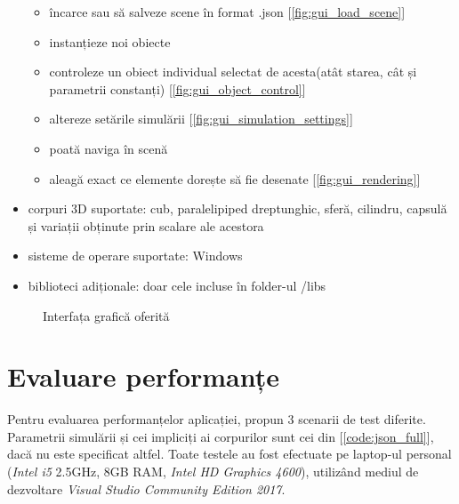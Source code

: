 \documentclass[12pt,a4paper]{report}
\begin{document}
\begin{itemize}
\begin{itemize}
			\item încarce sau să salveze scene în format .json [\autoref{fig:gui_load_scene}]
			\item instanțieze noi obiecte
			\item controleze un obiect individual selectat de acesta(atât starea, cât și parametrii constanți) [\autoref{fig:gui_object_control}]
			\item altereze setările simulării [\autoref{fig:gui_simulation_settings}]
			\item poată naviga în scenă
			\item aleagă exact ce elemente dorește să fie desenate [\autoref{fig:gui_rendering}]
		\end{itemize}
	\item corpuri 3D suportate: cub, paralelipiped dreptunghic, sferă, cilindru, capsulă și variații obținute prin scalare ale acestora
	\item sisteme de operare suportate: Windows
	\item biblioteci adiționale: doar cele incluse în folder-ul /libs
\end{itemize}

\begin{figure}[H]
	\centering
	\caption[]{Interfața grafică oferită}
	\label{fig:gui_showcase}
\end{figure}

\section{Evaluare performanțe}
Pentru evaluarea performanțelor aplicației, propun 3 scenarii de test diferite. Parametrii simulării și cei impliciți ai corpurilor sunt cei din [\autoref{code:json_full}], dacă nu este specificat altfel.
Toate testele au fost efectuate pe laptop-ul personal (\textit{Intel i5} 2.5GHz, 8GB RAM, \textit{Intel HD Graphics 4600}), utilizând mediul de dezvoltare \textit{Visual Studio Community Edition 2017}.
\end{document}
